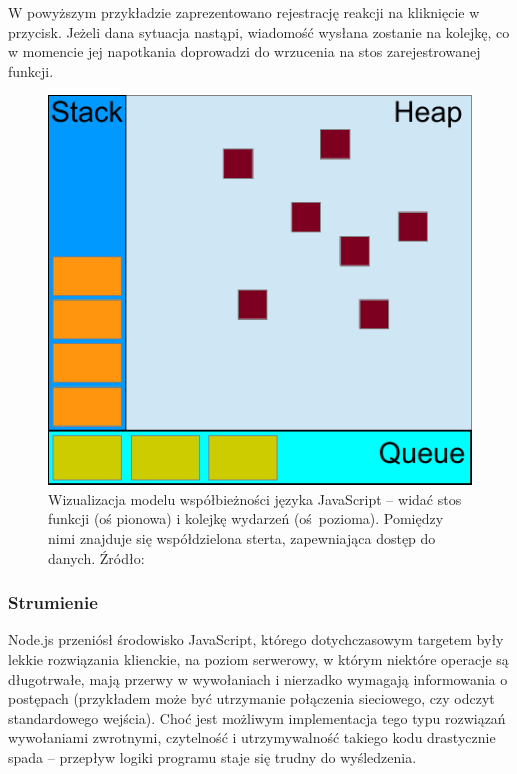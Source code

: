 W powyższym przykładzie zaprezentowano rejestrację reakcji na kliknięcie w przycisk. Jeżeli dana sytuacja nastąpi, wiadomość wysłana zostanie na kolejkę, co w momencie jej napotkania doprowadzi do wrzucenia na stos zarejestrowanej funkcji.

\begin{figure}[h]

    \centering
    \includegraphics[scale=0.6]{js-concurrency.pdf}

	\caption{Wizualizacja modelu współbieżności języka JavaScript -- widać stos funkcji (oś pionowa) i kolejkę wydarzeń (oś pozioma). Pomiędzy nimi znajduje się współdzielona sterta, zapewniająca dostęp do danych. Źródło: \cite{eventLoop}}

\end{figure}

\subsubsection{Strumienie}

Node.js przeniósł środowisko JavaScript, którego dotychczasowym targetem były lekkie rozwiązania klienckie, na poziom serwerowy, w którym niektóre operacje są długotrwałe, mają przerwy w wywołaniach i nierzadko wymagają informowania o postępach (przykładem może być utrzymanie połączenia sieciowego, czy odczyt standardowego wejścia). Choć jest możliwym implementacja tego typu rozwiązań  wywołaniami zwrotnymi, czytelność i utrzymywalność takiego kodu drastycznie spada -- przepływ logiki programu staje się trudny do wyśledzenia.

